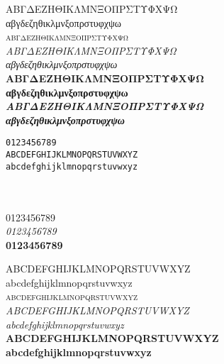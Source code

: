 \documentclass[10pt]{lecturenotes}
\begin{document}
\begin{sloppypar}
\begin{figure}[ht]
\begin{minipage}[b]{0.45\linewidth}
\noindent
ΑΒΓΔΕΖΗΘΙΚΛΜΝΞΟΠΡΣΤΥΦΧΨΩ\\
αβγδεζηθικλμνξοπρστυφχψω\\
\textsc{αβγδεζηθικλμνξοπρστυφχψω}\\
\textit{ΑΒΓΔΕΖΗΘΙΚΛΜΝΞΟΠΡΣΤΥΦΧΨΩ\\
αβγδεζηθικλμνξοπρστυφχψω \\}
\textbf{ΑΒΓΔΕΖΗΘΙΚΛΜΝΞΟΠΡΣΤΥΦΧΨΩ\\
αβγδεζηθικλμνξοπρστυφχψω}\\
\textbf{\textit{ΑΒΓΔΕΖΗΘΙΚΛΜΝΞΟΠΡΣΤΥΦΧΨΩ\\
αβγδεζηθικλμνξοπρστυφχψω}}\\


\end{minipage}
\hspace{0.5cm}
\begin{minipage}[b]{0.45\linewidth}

\noindent
\texttt{0123456789}\\


\noindent\texttt{ABCDEFGHIJKLMNOPQRSTUVWXYZ\\
abcdefghijklmnopqrstuvwxyz\\
}

\noindent
{}\\
\\

\noindent
\textsf{%
0123456789\\
\textit{0123456789}\\
\textbf{0123456789}\\
}

\noindent
\textsf{%
ABCDEFGHIJKLMNOPQRSTUVWXYZ\\
abcdefghijklmnopqrstuvwxyz\\
\textsc{abcdefghijklmnopqrstuvwxyz}\\
\textit{ABCDEFGHIJKLMNOPQRSTUVWXYZ\\
abcdefghijklmnopqrstuvwxyz}\\
\textbf{ABCDEFGHIJKLMNOPQRSTUVWXYZ\\
abcdefghijklmnopqrstuvwxyz}\\
}


\end{minipage}
\end{figure}
\end{sloppypar}
\end{document}
